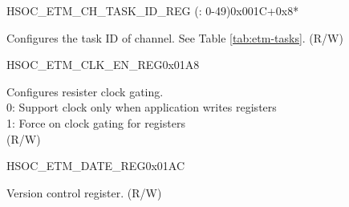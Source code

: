 \begin{register}{H}{SOC\_ETM\_CH\_TASK\_ID\_REG (: 0-49)}{0x001C+0x8*}\label{regdesc:SOCETMCH0TASKIDREG}
%
%
\regnewline%
\begin{regdesc}\begin{reglist}
\label{fielddesc:SOCETMCH0TASKID}\item [SOC\_ETM\_CH\regindex{n}\_TASK\_ID (\regindex{n}: 0-49)] Configures the task ID of channel. See Table \ref{tab:etm-tasks}. (R/W)
\end{reglist}\end{regdesc}
\end{register}


\begin{register}{H}{SOC\_ETM\_CLK\_EN\_REG}{0x01A8}\label{regdesc:SOCETMCLKENREG}
%
%
\regnewline%
\begin{regdesc}\begin{reglist}
\label{fielddesc:SOCETMCLKEN}\item [SOC\_ETM\_CLK\_EN] Configures resister clock gating.\\
0: Support clock only when application writes registers\\ 
1: Force on clock gating for registers\\
(R/W)
\end{reglist}\end{regdesc}
\end{register}


\begin{register}{H}{SOC\_ETM\_DATE\_REG}{0x01AC}\label{regdesc:SOCETMDATEREG}
%
%
\regnewline%
\begin{regdesc}\begin{reglist}
\label{fielddesc:SOCETMDATE}\item [SOC\_ETM\_DATE] Version control register. (R/W)
\end{reglist}\end{regdesc}
\end{register}
